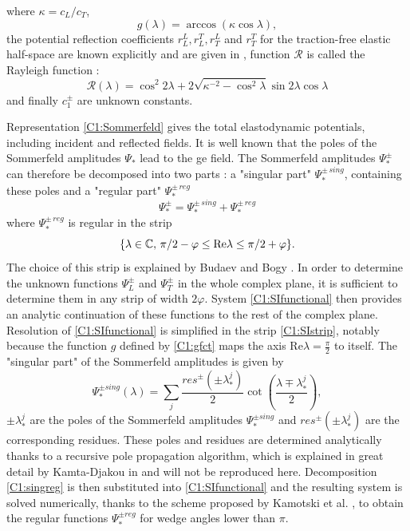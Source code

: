 where $\kappa=c_L/c_T$,
\begin{equation}
g(\lambda)=\arccos(\kappa\cos\lambda),
\label{C1:gfct}
\end{equation}
the potential reflection coefficients $r_L^L,r_L^T,r_T^L$ and $r_T^T$ for the traction-free elastic half-space are known explicitly and are given in \cite{KamotskiFradkin}, function $\mathcal{R}$ is called the Rayleigh function :
\begin{equation}
\mathcal{R}(\lambda)=\cos^2 2\lambda+2\sqrt{\kappa^{-2}-\cos^2\lambda}\sin 2\lambda \cos\lambda
\label{C1:defRayleigh}
\end{equation}
and finally $c_1^\pm$ are unknown constants.

Representation \eqref{C1:Sommerfeld} gives the total elastodynamic potentials, including incident and reflected fields. It is well known that the poles of the Sommerfeld amplitudes $\Psi_*$ lead to the \acrshort{ge} field. The Sommerfeld amplitudes $\Psi_*^\pm$ can therefore be decomposed into two parts : a "singular part" $\Psi_*^{\pm \, sing}$, containing these poles and a "regular part" $\Psi_*^{\pm \, reg}$
\begin{equation}
\Psi_*^\pm=\Psi_*^{\pm \, sing}+\Psi_*^{\pm \, reg}
\label{C1:singreg}
\end{equation}
where $\Psi_*^{\pm \, reg}$ is regular in the strip 
\begin{equation}
\{ \lambda \in \mathbb{C},\, \pi/2-\varphi \leq \rm Re \lambda \leq \pi/2+\varphi \}.
\label{C1:SIstrip}
\end{equation}
The choice of this strip is explained by Budaev and Bogy \cite{Rayleigh}. In order to determine the unknown functions $\Psi_L^\pm$ and $\Psi_T^\pm$ in the whole complex plane, it is sufficient to determine them in any strip of width $2\varphi$. System \eqref{C1:SIfunctional} then provides an analytic continuation of these functions to the rest of the complex plane. Resolution of \eqref{C1:SIfunctional} is simplified in the strip \eqref{C1:SIstrip}, notably because the function $g$ defined by \eqref{C1:gfct} maps the axis Re$\lambda=\frac{\pi}{2}$ to itself. The "singular part" of the Sommerfeld amplitudes is given by
\begin{equation}
\Psi_*^{\pm sing}(\lambda)=\sum_j \dfrac{res^\pm(\pm \lambda_*^j)}{2}\cot\left(\dfrac{\lambda\mp\lambda_*^j}{2}\right),
\end{equation}
$\pm\lambda_*^j$ are the poles of the Sommerfeld amplitudes $\Psi_*^{\pm sing}$ and  $res^\pm(\pm \lambda_*^j)$ are the corresponding residues. These poles and residues are determined analytically thanks to a recursive pole propagation algorithm, which is explained in great detail by Kamta-Djakou in \cite{AKDthese} and will not be reproduced here. Decomposition \eqref{C1:singreg} is then substituted into \eqref{C1:SIfunctional} and the resulting system is solved numerically, thanks to the scheme proposed by Kamotski et al. \cite{KamotskiFradkin}, to obtain the regular functions $\Psi_*^{\pm reg}$ for wedge angles lower than $\pi$.

